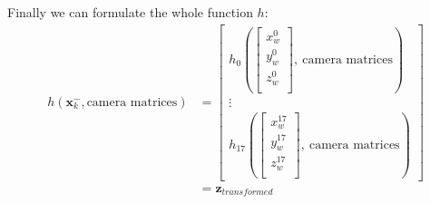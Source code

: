 Finally we can formulate the whole function $h$:
\begin{align}
h(\mathbf{x}^-_k, \text{camera matrices}) 
&= 
\begin{bmatrix}
h_0(\begin{bmatrix}
x^0_w \\
y^0_w \\
z^0_w \\
\end{bmatrix},\ \text{camera matrices})\\
\vdots \\
h_{17}(\begin{bmatrix}
x^{17}_w \\
y^{17}_w \\
z^{17}_w \\
\end{bmatrix},\ \text{camera matrices}) 
\end{bmatrix}\\
&= \mathbf{z}_{transformed}
\end{align}


